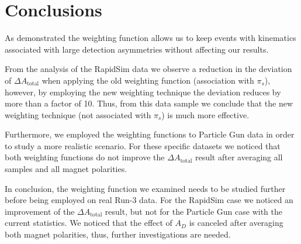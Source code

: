 \documentclass{article}
\begin{document}
        \section{Conclusions}
        As demonstrated the weighting function allows us to keep events with kinematics associated with large detection asymmetries without affecting our results.

        From the analysis of the RapidSim data we observe a reduction in the deviation of $\Delta A_\text{total}$ when applying the old weighting function (association with $\pi_s$), however, by employing the new weighting technique the deviation reduces by more than a factor of 10.
        Thus, from this data sample we conclude that the new weighting technique (not associated with $\pi_s$) is much more effective.

        Furthermore, we employed the weighting functions to Particle Gun data in order to study a more realistic scenario.
        For these specific datasets we noticed that both weighting functions do not improve the $\Delta A_\text{total}$ result after averaging all samples and all magnet polarities.
        

        In conclusion, the weighting function we examined needs to be studied further before being employed on real Run-3 data. 
        For the RapidSim case we noticed an improvement of the $\Delta A_\text{total}$ result, but not for the Particle Gun case with the current statistics.
        We noticed that the effect of $A_D$ is canceled after averaging both magnet polarities, thus, further investigations are needed.
        
        \pagebreak
        \nocite{*}
        \printbibliography[notcategory=cited]
\end{document}
